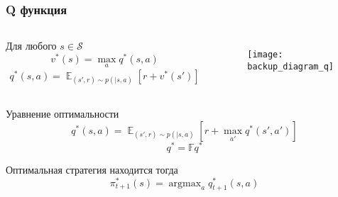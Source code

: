 \documentclass[notheorems]{beamer} %
\DeclareMathOperator*{\argmax}{argmax}
\begin{document}
\begin{frame}
	\frametitle{Q функция }
	\begin{columns}
		
		Для любого $s \in \mathcal{S}$
		$$v^*(s) = \max_a q^*(s,a)$$
		\begin{align*}
		q^*(s,a) =  \mathop{\mathbb{E}}_{(s',r) \sim p( \mid s,a)}[r + v^*(s')]  
		\end{align*}
		
		
		
		
		\begin{figure}
			\texttt{[image: backup\_diagram\_q]}
		\end{figure}
	\end{columns}
 \begin{alertblock}{Уравнение оптимальности}
 	$$ q^*(s,a) =  \mathop{\mathbb{E}}_{(s',r) \sim p( \mid s,a)}[r + \max_{a'} q^*(s',a')] $$
 	$$ q^* = \mathbb{F}q^*$$
 \end{alertblock}
  
 Оптимальная стратегия находится тогда $$\pi_{t+1}^*(s) = \argmax_a q_{t+1}^*(s,a)$$

\end{frame}
\end{document}
